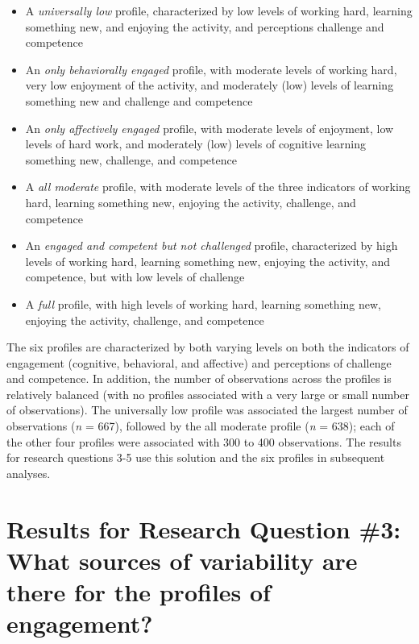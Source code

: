 \documentclass[]{msu-thesis}
\providecommand{\tightlist}{%
  \setlength{\itemsep}{0pt}\setlength{\parskip}{0pt}}
\theoremstyle{definition}
\theoremstyle{definition}
\theoremstyle{definition}
\theoremstyle{remark}
\begin{document}
\begin{itemize}
\tightlist
\item
  A \emph{universally low} profile, characterized by low levels of
  working hard, learning something new, and enjoying the activity, and
  perceptions challenge and competence
\item
  An \emph{only behaviorally engaged} profile, with moderate levels of
  working hard, very low enjoyment of the activity, and moderately (low)
  levels of learning something new and challenge and competence
\item
  An \emph{only affectively engaged} profile, with moderate levels of
  enjoyment, low levels of hard work, and moderately (low) levels of
  cognitive learning something new, challenge, and competence
\item
  A \emph{all moderate} profile, with moderate levels of the three
  indicators of working hard, learning something new, enjoying the
  activity, challenge, and competence
\item
  An \emph{engaged and competent but not challenged} profile,
  characterized by high levels of working hard, learning something new,
  enjoying the activity, and competence, but with low levels of
  challenge
\item
  A \emph{full} profile, with high levels of working hard, learning
  something new, enjoying the activity, challenge, and competence
\end{itemize}

The six profiles are characterized by both varying levels on both the
indicators of engagement (cognitive, behavioral, and affective) and
perceptions of challenge and competence. In addition, the number of
observations across the profiles is relatively balanced (with no
profiles associated with a very large or small number of observations).
The universally low profile was associated the largest number of
observations (\emph{n} = 667), followed by the all moderate profile
(\emph{n} = 638); each of the other four profiles were associated with
300 to 400 observations. The results for research questions 3-5 use this
solution and the six profiles in subsequent analyses.

\section{Results for Research Question \#3: What sources of variability
are there for the profiles of
engagement?}\label{results-for-research-question-3-what-sources-of-variability-are-there-for-the-profiles-of-engagement}
\end{document}
